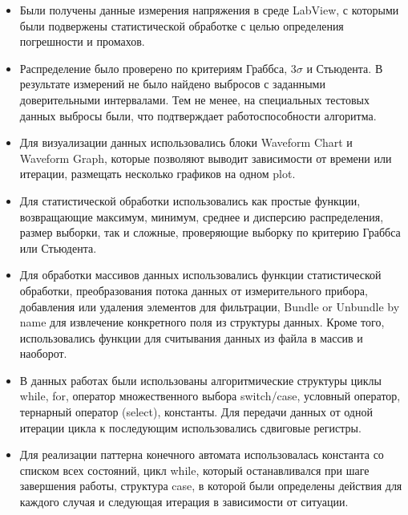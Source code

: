 \documentclass[a4paper,14pt]{article}
\begin{document}
\begin{itemize}
	\item Были получены данные измерения напряжения в среде LabView, с которыми были подвержены статистической обработке с целью определения погрешности и промахов.
	\item Распределение было проверено по критериям Граббса, $3 \sigma$ и Стьюдента.
	В результате измерений не было найдено выбросов с заданными доверительными интервалами.
	Тем не менее, на специальных тестовых данных выбросы были, что подтверждает работоспособности алгоритма.
	\item Для визуализации данных использовались блоки Waveform Chart и Waveform Graph, которые позволяют выводит зависимости от времени или итерации, размещать несколько графиков на одном plot.
	\item Для статистической обработки использовались как простые функции, возвращающие максимум, минимум, среднее и дисперсию распределения, размер выборки, так и сложные, проверяющие выборку по критерию Граббса или Стьюдента.
	\item Для обработки массивов данных использовались функции статистической обработки, преобразования потока данных от измерительного прибора, добавления или удаления элементов для фильтрации, Bundle or Unbundle by name для извлечение конкретного поля из структуры данных. 
	Кроме того, использовались функции для считывания данных из файла в массив и наоборот.
	\item В данных работах были использованы алгоритмические структуры циклы while, for, оператор множественного выбора switch/case, условный оператор, тернарный оператор (select), константы.
	Для передачи данных от одной итерации цикла к последующим использовались сдвиговые регистры.
	\item Для реализации паттерна конечного автомата использовалась константа со списком всех состояний, цикл while, который останавливался при шаге завершения работы, структура case, в которой были определены действия для каждого случая и следующая итерация в зависимости от ситуации.
\end{itemize}
\end{document}
